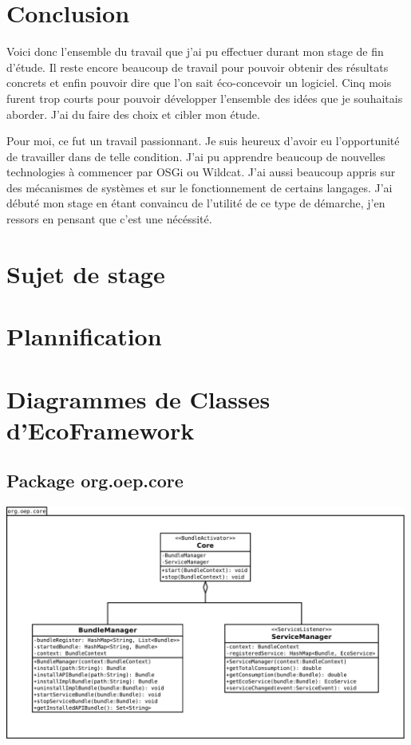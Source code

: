 \documentclass[a4paper, 11pt]{report}
\begin{document}
\chapter{Conclusion}
Voici donc l'ensemble du travail que j'ai pu effectuer durant mon stage de fin d'étude. Il reste encore beaucoup de travail pour pouvoir obtenir des résultats concrets et enfin pouvoir dire que l'on sait éco-concevoir un logiciel. Cinq mois furent trop courts pour pouvoir développer l'ensemble des idées que je souhaitais aborder. J'ai du faire des choix et cibler mon étude.

Pour moi, ce fut un travail passionnant. Je suis heureux d'avoir eu l'opportunité de travailler dans de telle condition. J'ai pu apprendre beaucoup de nouvelles technologies à commencer par OSGi ou Wildcat. J'ai aussi beaucoup appris sur des mécanismes de systèmes et sur le fonctionnement de certains langages. J'ai débuté mon stage en étant convaincu de l'utilité de ce type de démarche, j'en ressors en pensant que c'est une nécéssité.



\listoffigures{}
\listoftables{}
\appendix

\chapter{Sujet de stage}




\chapter{Plannification}


\chapter{Diagrammes de Classes d'EcoFramework}
\section{Package org.oep.core}
	\begin{centering}
		\includegraphics[width=0.99\textwidth]{figures/EcoPattern_Core_Classes}
	\end{centering}
\end{document}
